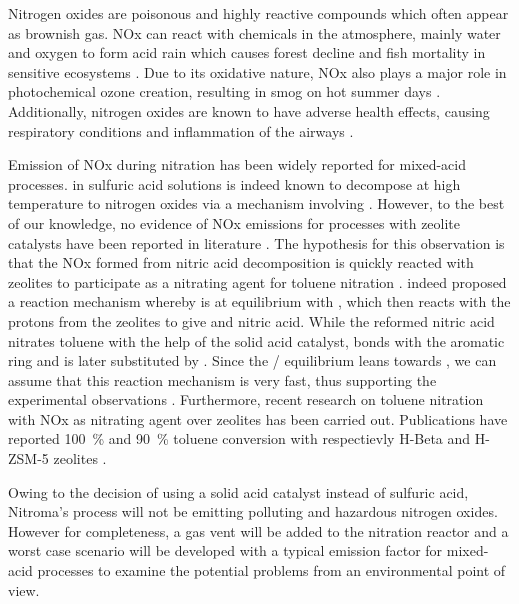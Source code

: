 Nitrogen oxides are poisonous and highly reactive compounds which often appear as brownish gas. NOx can react with chemicals in the atmosphere, mainly water and oxygen to form acid rain which causes forest decline and fish mortality in sensitive ecosystems \cite{us_epa_basic_2016}. Due to its oxidative nature, NOx also plays a major role in photochemical ozone creation, resulting in smog on hot summer days \cite{us_epa_nitrogen_nodate}. Additionally, nitrogen oxides are known to have adverse health effects, causing respiratory conditions and inflammation of the airways \cite{us_epa_basic_2016}. 

Emission of NOx during nitration has been widely reported for mixed-acid processes\cite{halder_nitration_2007,processes_research_inc_air_1972}.  in sulfuric acid solutions is indeed known to decompose at high temperature to nitrogen oxides via a mechanism involving  \cite{robertson_kinetics_1955, kazakov_kinetics_1987}. However, to the best of our knowledge, no evidence of NOx emissions for processes with zeolite catalysts have been reported in literature \cite{vassena_selective_1999,sreedhar_scientific_2013}. The hypothesis for this observation is that the NOx formed from nitric acid decomposition is quickly reacted with zeolites to participate as a nitrating agent for toluene nitration \cite{akolekar_high_1995}. \textcite{akolekar_high_1995} indeed proposed a reaction mechanism whereby  is at equilibrium with , which then reacts with the protons from the zeolites to give  and nitric acid. While the reformed nitric acid nitrates toluene with the help of the solid acid catalyst,  bonds with the aromatic ring and is later substituted by . Since the / equilibrium leans towards , we can assume that this reaction mechanism is very fast, thus supporting the experimental observations \cite{university_of_texas_chapter_nodate}. Furthermore, recent research on toluene nitration with NOx as nitrating agent over zeolites has been carried out. Publications have reported \SI{100}{\percent} and \SI{90}{\percent} toluene conversion with respectievly H-Beta and H-ZSM-5 zeolites \cite{pande_nitration_2010, peng_zeolite-assisted_2001}.

Owing to the decision of using a solid acid catalyst instead of sulfuric acid, Nitroma's process will not be emitting polluting and hazardous nitrogen oxides. However for completeness, a gas vent will be added to the nitration reactor and a worst case scenario will be developed with a typical emission factor for mixed-acid processes to examine the potential problems from an environmental point of view.

